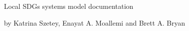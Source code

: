 \begin{titlepage}
\centering
\Huge
Local SDGs systems model documentation

\parskip 2cm
\huge
by 
\linebreak
Katrina Szetey,
\linebreak
Enayat A. Moallemi
\linebreak
and Brett A. Bryan
\end{titlepage}
\pagebreak